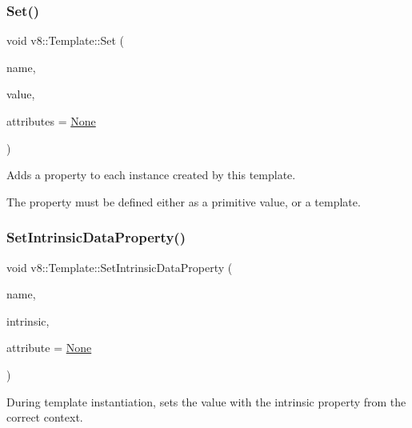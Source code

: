 \subsubsection{\texorpdfstring{Set()}{Set()}}
{\footnotesize\ttfamily void v8\+::\+Template\+::\+Set (\begin{DoxyParamCaption}\item[{\mbox{\hyperlink{classv8_1_1Local}{Local}}$<$ \mbox{\hyperlink{classv8_1_1Name}{Name}} $>$}]{name,  }\item[{\mbox{\hyperlink{classv8_1_1Local}{Local}}$<$ \mbox{\hyperlink{classv8_1_1Data}{Data}} $>$}]{value,  }\item[{\mbox{\hyperlink{namespacev8_a05f25f935e108a1ea2d150e274602b87}{Property\+Attribute}}}]{attributes = {\ttfamily \mbox{\hyperlink{namespacev8_a05f25f935e108a1ea2d150e274602b87a7ab4d58719c33b3ea2dfaefa29b111df}{None}}} }\end{DoxyParamCaption})}

Adds a property to each instance created by this template.

The property must be defined either as a primitive value, or a template. \mbox{\label{classv8_1_1Template_aef172ef714818a210d815de389a5ab77}} 
\subsubsection{\texorpdfstring{Set\+Intrinsic\+Data\+Property()}{SetIntrinsicDataProperty()}}
{\footnotesize\ttfamily void v8\+::\+Template\+::\+Set\+Intrinsic\+Data\+Property (\begin{DoxyParamCaption}\item[{\mbox{\hyperlink{classv8_1_1Local}{Local}}$<$ \mbox{\hyperlink{classv8_1_1Name}{Name}} $>$}]{name,  }\item[{Intrinsic}]{intrinsic,  }\item[{\mbox{\hyperlink{namespacev8_a05f25f935e108a1ea2d150e274602b87}{Property\+Attribute}}}]{attribute = {\ttfamily \mbox{\hyperlink{namespacev8_a05f25f935e108a1ea2d150e274602b87a7ab4d58719c33b3ea2dfaefa29b111df}{None}}} }\end{DoxyParamCaption})}

During template instantiation, sets the value with the intrinsic property from the correct context. \mbox{\label{classv8_1_1Template_a983acad576914228a522965fac87c786}} 
